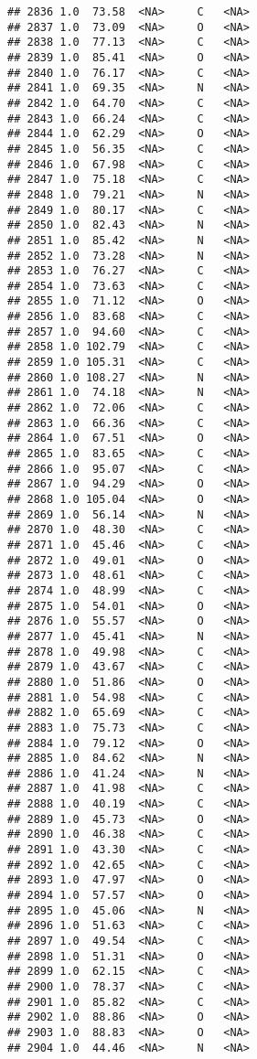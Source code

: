 \documentclass[
]{article}
\begin{document}
\begin{verbatim}
## 2836 1.0  73.58  <NA>     C   <NA>
## 2837 1.0  73.09  <NA>     O   <NA>
## 2838 1.0  77.13  <NA>     C   <NA>
## 2839 1.0  85.41  <NA>     O   <NA>
## 2840 1.0  76.17  <NA>     C   <NA>
## 2841 1.0  69.35  <NA>     N   <NA>
## 2842 1.0  64.70  <NA>     C   <NA>
## 2843 1.0  66.24  <NA>     C   <NA>
## 2844 1.0  62.29  <NA>     O   <NA>
## 2845 1.0  56.35  <NA>     C   <NA>
## 2846 1.0  67.98  <NA>     C   <NA>
## 2847 1.0  75.18  <NA>     C   <NA>
## 2848 1.0  79.21  <NA>     N   <NA>
## 2849 1.0  80.17  <NA>     C   <NA>
## 2850 1.0  82.43  <NA>     N   <NA>
## 2851 1.0  85.42  <NA>     N   <NA>
## 2852 1.0  73.28  <NA>     N   <NA>
## 2853 1.0  76.27  <NA>     C   <NA>
## 2854 1.0  73.63  <NA>     C   <NA>
## 2855 1.0  71.12  <NA>     O   <NA>
## 2856 1.0  83.68  <NA>     C   <NA>
## 2857 1.0  94.60  <NA>     C   <NA>
## 2858 1.0 102.79  <NA>     C   <NA>
## 2859 1.0 105.31  <NA>     C   <NA>
## 2860 1.0 108.27  <NA>     N   <NA>
## 2861 1.0  74.18  <NA>     N   <NA>
## 2862 1.0  72.06  <NA>     C   <NA>
## 2863 1.0  66.36  <NA>     C   <NA>
## 2864 1.0  67.51  <NA>     O   <NA>
## 2865 1.0  83.65  <NA>     C   <NA>
## 2866 1.0  95.07  <NA>     C   <NA>
## 2867 1.0  94.29  <NA>     O   <NA>
## 2868 1.0 105.04  <NA>     O   <NA>
## 2869 1.0  56.14  <NA>     N   <NA>
## 2870 1.0  48.30  <NA>     C   <NA>
## 2871 1.0  45.46  <NA>     C   <NA>
## 2872 1.0  49.01  <NA>     O   <NA>
## 2873 1.0  48.61  <NA>     C   <NA>
## 2874 1.0  48.99  <NA>     C   <NA>
## 2875 1.0  54.01  <NA>     O   <NA>
## 2876 1.0  55.57  <NA>     O   <NA>
## 2877 1.0  45.41  <NA>     N   <NA>
## 2878 1.0  49.98  <NA>     C   <NA>
## 2879 1.0  43.67  <NA>     C   <NA>
## 2880 1.0  51.86  <NA>     O   <NA>
## 2881 1.0  54.98  <NA>     C   <NA>
## 2882 1.0  65.69  <NA>     C   <NA>
## 2883 1.0  75.73  <NA>     C   <NA>
## 2884 1.0  79.12  <NA>     O   <NA>
## 2885 1.0  84.62  <NA>     N   <NA>
## 2886 1.0  41.24  <NA>     N   <NA>
## 2887 1.0  41.98  <NA>     C   <NA>
## 2888 1.0  40.19  <NA>     C   <NA>
## 2889 1.0  45.73  <NA>     O   <NA>
## 2890 1.0  46.38  <NA>     C   <NA>
## 2891 1.0  43.30  <NA>     C   <NA>
## 2892 1.0  42.65  <NA>     C   <NA>
## 2893 1.0  47.97  <NA>     O   <NA>
## 2894 1.0  57.57  <NA>     O   <NA>
## 2895 1.0  45.06  <NA>     N   <NA>
## 2896 1.0  51.63  <NA>     C   <NA>
## 2897 1.0  49.54  <NA>     C   <NA>
## 2898 1.0  51.31  <NA>     O   <NA>
## 2899 1.0  62.15  <NA>     C   <NA>
## 2900 1.0  78.37  <NA>     C   <NA>
## 2901 1.0  85.82  <NA>     C   <NA>
## 2902 1.0  88.86  <NA>     O   <NA>
## 2903 1.0  88.83  <NA>     O   <NA>
## 2904 1.0  44.46  <NA>     N   <NA>

\end{verbatim}
\end{document}
